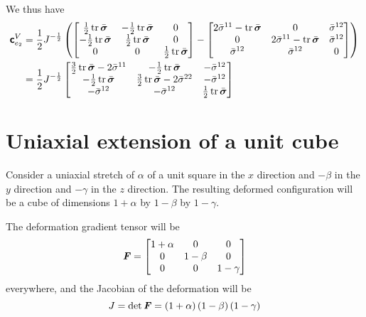 We thus have
\begin{equation}
  \begin{split}
    \tensorfour{c}_{e_{2}}^{V}&=\dfrac{1}{2}J^{-\frac{1}{2}}\pbrac{\begin{bmatrix}
        \frac{1}{2}\trace{}{\bar{\tensor{\sigma}}} & -\frac{1}{2}\trace{}{\bar{\tensor{\sigma}}} & 0 \\
        -\frac{1}{2}\trace{}{\bar{\tensor{\sigma}}} & \frac{1}{2}\trace{}{\bar{\tensor{\sigma}}} & 0 \\
        0 & 0 & \frac{1}{2}\trace{}{\bar{\tensor{\sigma}}}
      \end{bmatrix}-\begin{bmatrix}
      2\bar{\sigma}^{11}-\trace{}{\bar{\tensor{\sigma}}} & 0 & \bar{\sigma}^{12}
      \\
      0 & 2\bar{\sigma}^{11}-\trace{}{\bar{\tensor{\sigma}}} & \bar{\sigma}^{12}
      \\
      \bar{\sigma}^{12} & \bar{\sigma}^{12} & 0
    \end{bmatrix}}\\
    &=\dfrac{1}{2}J^{-\frac{1}{2}}\begin{bmatrix}
      \frac{3}{2}\trace{}{\bar{\tensor{\sigma}}}-2\bar{\sigma}^{11} &
      -\frac{1}{2}\trace{}{\bar{\tensor{\sigma}}} & -\bar{\sigma}^{12} \\
      -\frac{1}{2}\trace{}{\bar{\tensor{\sigma}}} &
      \frac{3}{2}\trace{}{\bar{\tensor{\sigma}}}-2\bar{\sigma}^{22} &
      -\bar{\sigma}^{12} \\
      -\bar{\sigma}^{12} & -\bar{\sigma}^{12} &
      \frac{1}{2}\trace{}{\bar{\tensor{\sigma}}}
    \end{bmatrix}
  \end{split}
\end{equation}

\section{Uniaxial extension of a unit cube}

Consider a uniaxial stretch of $\alpha$ of a unit square in the $x$ direction
and $-\beta$ in the $y$ direction and $-\gamma$ in the $z$ direction. The
resulting deformed configuration will be a cube of dimensions $1+\alpha$ by
$1-\beta$ by $1-\gamma$.

The deformation gradient tensor will be
\begin{equation}
  \boldsymbol{\mathit{F}}= \begin{bmatrix}
    1+\alpha & 0 & 0 \\
    0 & 1-\beta & 0 \\
    0 & 0 & 1-\gamma
  \end{bmatrix}
\end{equation}
everywhere, and the Jacobian of the deformation will be 
\begin{equation}
  J = \det \boldsymbol{\mathit{F}}=\left( 1+\alpha \right)\left( 1-\beta \right)\left( 1-\gamma \right)
\end{equation}

